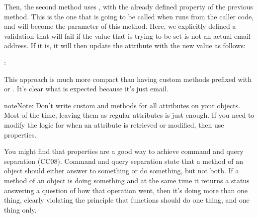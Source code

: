 \documentclass[a4paper,10pt,english]{sphinxmanual}
\begin{document}
Then, the second method uses , with the already defined property of the previous method. This is the
one that is going to be called when  runs from the caller code, and  will
become the parameter of this method. Here, we explicitly defined a validation that will fail if the value that is trying
to be set is not an actual email address. If it is, it will then update the attribute with the new value as follows:

\begin{sphinxVerbatim}[commandchars=\\\{\}]
  
  
: 
  
\end{sphinxVerbatim}

This approach is much more compact than having custom methods prefixed with  or . It’s clear what is
expected because it’s just email.

\begin{sphinxadmonition}{note}{Note:}
Don’t write custom  and  methods for all attributes on your objects. Most of the time, leaving
them as regular attributes is just enough. If you need to modify the logic for when an attribute is retrieved or
modified, then use properties.
\end{sphinxadmonition}

You might find that properties are a good way to achieve command and query separation (CC08). Command and query
separation state that a method of an object should either answer to something or do something, but not both. If a method
of an object is doing something and at the same time it returns a status answering a question of how that operation
went, then it’s doing more than one thing, clearly violating the principle that functions should do one thing, and one
thing only.
\end{document}
